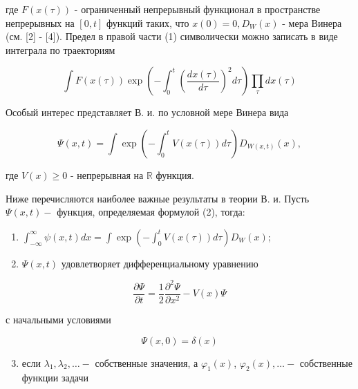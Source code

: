 \documentclass[10pt]{article}
\begin{document}
где $F(x(\tau))$ - ограниченный непрерывный функционал в пространстве непрерывных на $[0, t]$ функций таких, что $x(0)=0, D_{W}(x)$ - мера Винера (см. [2] - [4]). Предел в правой части (1) символически можно записать в виде интеграла по траекториям



\[

\int F(x(\tau)) \exp \left(-\int_{0}^{t}\left(\frac{d x(\tau)}{d \tau}\right)^{2} d \tau\right) \prod_{\tau} d x(\tau)

\]



Особый интерес представляет В. и. по условной мере Винера вида



\[

\Psi(x, t)=\int \exp \left(-\int_{0}^{t} V(x(\tau)) d \tau\right) D_{W(x, t)}(x),

\]



где $V(x) \geqslant 0$ - непрерывная на $\mathbb{R}$ функция.



Ниже перечисляются наиболее важные результаты в теории В. и. Пусть $\Psi(x, t)-$ функция, определяемая формулой (2), тогда:



\begin{enumerate}

  \item $\int_{-\infty}^{\infty} \psi(x, t) d x=\int \exp \left(-\int_{0}^{t} V(x(\tau)) d \tau\right) D_{W}(x)$;



  \item $\Psi(x, t)$ удовлетворяет дифференциальному уравнению



\end{enumerate}



\[

\frac{\partial \Psi}{\partial t}=\frac{1}{2} \frac{\partial^{2} \Psi}{\partial x^{2}}-V(x) \Psi

\]



с начальными условиями



\[

\Psi(x, 0)=\delta(x)

\]



\begin{enumerate}

  \setcounter{enumi}{2}

  \item если $\lambda_{1}, \lambda_{2}, \ldots-$ собственные значения, а $\varphi_{1}(x)$, $\varphi_{2}(x), \ldots-$ собственные функции задачи

\end{enumerate}
\end{document}
